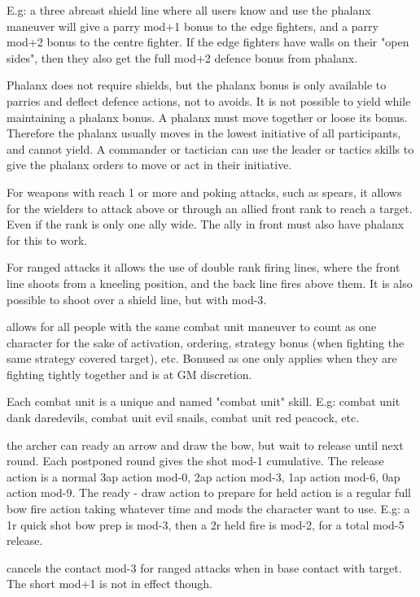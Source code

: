 E.g: a three abreast shield line where all users know and use the phalanx maneuver will give a parry mod+1 bonus to the edge fighters, and a parry mod+2 bonus to the centre fighter. If the edge fighters have walls on their "open sides", then they also get the full mod+2 defence bonus from phalanx.

Phalanx does not require shields, but the phalanx bonus is only available to parries and deflect defence actions, not to avoids.
It is not possible to yield while maintaining a phalanx bonus. A phalanx must move together or loose its bonus. Therefore the phalanx usually moves in the lowest initiative of all participants, and cannot yield. A commander or tactician can use the leader or tactics skills to give the phalanx orders to move or act in their initiative.

For weapons with reach 1 or more and poking attacks, such as spears, it allows for the wielders to attack above or through an allied front rank to reach a target. Even if the rank is only one ally wide. The ally in front must also have phalanx for this to work.

For ranged attacks it allows the use of double rank firing lines, where the front line shoots from a kneeling position, and the back line fires above them. It is also possible to shoot over a shield line, but with mod-3.


 allows for all people with the same combat unit maneuver to count as one character for the sake of activation, ordering, strategy bonus (when fighting the same strategy covered target), etc. Bonused as one only applies when they are fighting tightly together and is at GM discretion.

Each combat unit is a unique and named "combat unit" skill. E.g: combat unit dank daredevils, combat unit evil snails, combat unit red peacock, etc.


 the archer can ready an arrow and draw the bow, but wait to release until next round. Each postponed round gives the shot mod-1 cumulative. The release action is a normal 3ap action mod-0, 2ap action mod-3, 1ap action mod-6, 0ap action mod-9.
The ready - draw action to prepare for held action is a regular full bow fire action taking whatever time and mods the character want to use.
E.g: a 1r quick shot bow prep is mod-3, then a 2r held fire is mod-2, for a total mod-5 release.


 cancels the contact mod-3 for ranged attacks when in base contact with target. The short mod+1 is not in effect though.


